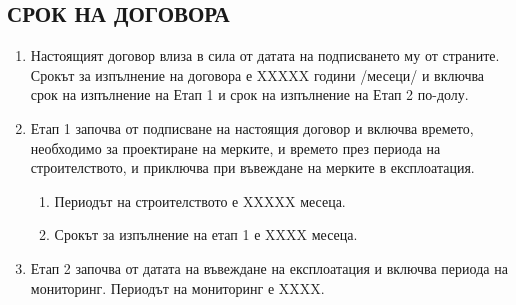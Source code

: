 \subsection{СРОК НА ДОГОВОРА}
\begin{enumerate}
\item Настоящият договор влиза в сила от датата на подписването му от
  страните. Срокът за изпълнение на договора е XXXXX години /месеци/ и
  включва срок на изпълнение на Етап 1 и срок на изпълнение на Етап 2
  по-долу.
\item Етап 1 започва от подписване на настоящия договор и включва
  времето, необходимо за проектиране на мерките, и времето през
  периода на строителството, и приключва при въвеждане на мерките в
  експлоатация.
  \begin{enumerate}
  \item Периодът на строителството е XXXXX месеца.
  \item Срокът за изпълнение на етап 1 е XXXX месеца.
  \end{enumerate}
\item Етап 2 започва от датата на въвеждане на експлоатация и включва
  периода на мониторинг. Периодът на мониторинг е XXXX.
\end{enumerate}

